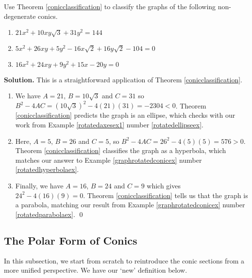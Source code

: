 \begin{ex} \label{conicdiscex}  Use Theorem \ref{conicclassification} to classify the graphs of the following non-degenerate conics.

\begin{enumerate}

\item   $21x^2+10xy\sqrt{3}+31y^2=144$  

\item   $5x^2+26xy+5y^2-16x\sqrt{2}+16y\sqrt{2}-104 = 0$  

\item   $16x^2+24xy+9y^2 +15x-20y = 0$  

\end{enumerate}

{\bf Solution.} This is a straightforward application of Theorem \ref{conicclassification}.

 \begin{enumerate}
 
\item  We have $A = 21$, $B = 10\sqrt{3}$ and $C = 31$ so $B^2 - 4AC = (10\sqrt{3})^2 - 4(21)(31) = -2304 < 0$.  Theorem \ref{conicclassification} predicts the graph is an ellipse, which checks with our work from Example \ref{rotatedaxesex1} number \ref{rotatedellipseex}.
 
\item  Here,  $A = 5$, $B = 26$ and $C = 5$, so $B^2 - 4AC = 26^2 - 4(5)(5) = 576 > 0$. Theorem \ref{conicclassification} classifies the graph as a hyperbola, which matches our answer to Example \ref{graphrotatedconicex} number \ref{rotatedhyperbolaex}. 

\item  Finally,  we have $A = 16$, $B = 24$ and $C = 9$ which gives $24^2 - 4(16)(9) = 0$. Theorem \ref{conicclassification} tells us that the graph is a parabola,  matching our result from Example \ref{graphrotatedconicex} number \ref{rotatedparabolaex}. \qed

\end{enumerate}

\end{ex}


\subsection{The Polar Form of Conics}
\label{polarformofconics}
\enlargethispage{.25in}
In this subsection, we start from scratch to reintroduce the conic sections from a more unified perspective.  We have our `new' definition below.


